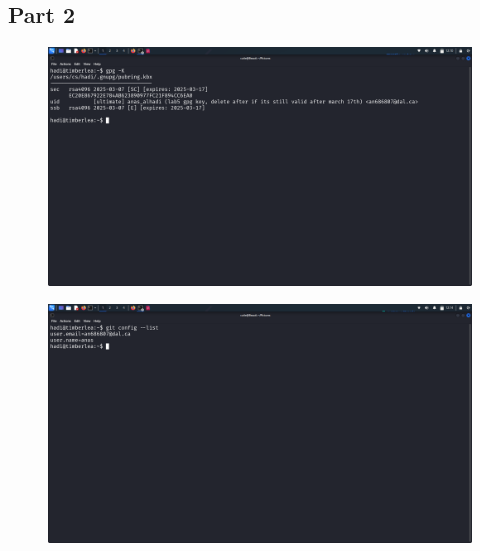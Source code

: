 \documentclass{article}
\numberwithin{equation}{subsection}
\begin{document}
	\subsection{Part 2}
	\begin{figure}[H]
		\includegraphics[width=430pt]{pics/Screenshot_2025-03-07_12_10_50.png}
	\end{figure}
	\begin{figure}[H]
		\includegraphics[width=430pt]{pics/Screenshot_2025-03-07_12_14_42.png}
	\end{figure}

	\newpage
\end{document}
